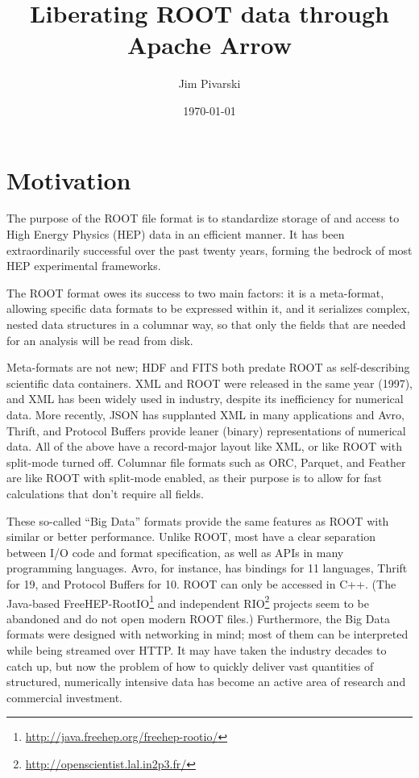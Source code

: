 \documentclass{article}
\title{Liberating ROOT data through Apache Arrow}
\author{Jim Pivarski}
\date{\today}
\begin{document}
\maketitle

\section*{Motivation}

The purpose of the ROOT file format is to standardize storage of and access to High Energy Physics (HEP) data in an efficient manner. It has been extraordinarily successful over the past twenty years, forming the bedrock of most HEP experimental frameworks.

The ROOT format owes its success to two main factors: it is a meta-format, allowing specific data formats to be expressed within it, and it serializes complex, nested data structures in a columnar way, so that only the fields that are needed for an analysis will be read from disk.

Meta-formats are not new; HDF and FITS both predate ROOT as self-describing scientific data containers. XML and ROOT were released in the same year (1997), and XML has been widely used in industry, despite its inefficiency for numerical data. More recently, JSON has supplanted XML in many applications and Avro, Thrift, and Protocol Buffers provide leaner (binary) representations of numerical data. All of the above have a record-major layout like XML, or like ROOT with split-mode turned off. Columnar file formats such as ORC, Parquet, and Feather are like ROOT with split-mode enabled, as their purpose is to allow for fast calculations that don't require all fields.

These so-called ``Big Data'' formats provide the same features as ROOT with similar or better performance. Unlike ROOT, most have a clear separation between I/O code and format specification, as well as APIs in many programming languages. Avro, for instance, has bindings for 11 languages, Thrift for 19, and Protocol Buffers for 10. ROOT can only be accessed in C++. (The Java-based FreeHEP-RootIO\footnote{\url{http://java.freehep.org/freehep-rootio/}} and independent RIO\footnote{\url{http://openscientist.lal.in2p3.fr/}} projects seem to be abandoned and do not open modern ROOT files.) Furthermore, the Big Data formats were designed with networking in mind; most of them can be interpreted while being streamed over HTTP. It may have taken the industry decades to catch up, but now the problem of how to quickly deliver vast quantities of structured, numerically intensive data has become an active area of research and commercial investment.
\end{document}
